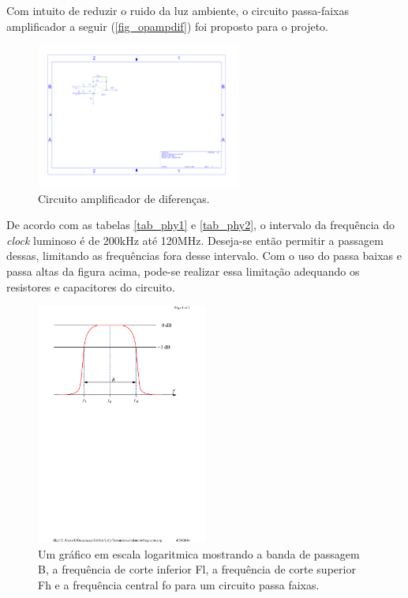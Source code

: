 	Com intuito de reduzir o ruido da luz ambiente, o circuito passa-faixas amplificador a seguir (\autoref{fig_opampdif}) foi proposto para o projeto.
	
	\begin{figure}[h!]
		\caption{\label{fig_opampdif}Circuito amplificador de diferenças.}
		\centering
		\includegraphics[width=0.6\textwidth, trim={5cm 12.29cm 17.6cm 4.3cm},clip]{opamp-dif2.pdf}
	\end{figure}
	
	De acordo com as tabelas \ref{tab_phy1} e \ref{tab_phy2}, o intervalo da frequência do \textit{clock} luminoso é de 200kHz até 120MHz. Deseja-se então  permitir a passagem dessas, limitando as frequências fora desse intervalo. Com o uso do passa baixas e passa altas da figura acima, pode-se realizar essa limitação adequando os resistores e capacitores do circuito.
	
	\begin{figure}[htb]
		\caption{\label{fig_frequenciacentral}Um gráfico em escala logaritmica mostrando a banda de passagem B, a frequência de corte inferior Fl, a frequência de corte superior Fh e a frequência central fo para um circuito passa faixas.}
		\centering
		\includegraphics[width=0.5\textwidth, trim={4.5cm 17cm 3.3cm 2cm},clip]{freq-corte.pdf}
	\end{figure}
	
